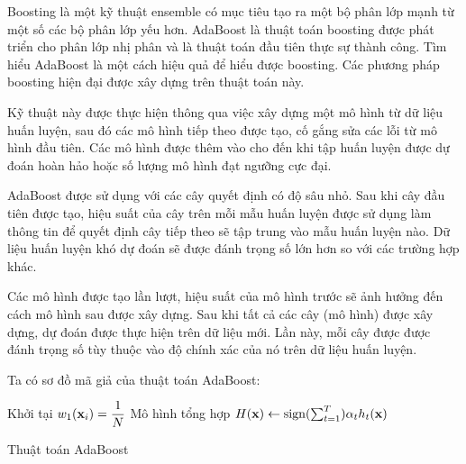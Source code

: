 Boosting là một kỹ thuật ensemble có mục tiêu tạo ra một bộ phân lớp mạnh từ một số các bộ phân lớp yếu hơn. 
AdaBoost là thuật toán boosting được phát triển cho phân lớp nhị phân và là thuật toán đầu tiên thực sự thành công. 
Tìm hiểu AdaBoost là một cách hiệu quả để hiểu được boosting. Các phương pháp boosting hiện đại được xây dựng trên thuật toán này.

Kỹ thuật này được thực hiện thông qua việc xây dựng một mô hình từ dữ liệu huấn luyện, sau đó các mô hình tiếp theo được tạo, cố gắng sửa các lỗi từ mô hình đầu tiên. 
Các mô hình được thêm vào cho đến khi tập huấn luyện được dự đoán hoàn hảo hoặc số lượng mô hình đạt ngưỡng cực đại.

AdaBoost được sử dụng với các cây quyết định có độ sâu nhỏ. 
Sau khi cây đầu tiên được tạo, hiệu suất của cây trên mỗi mẫu huấn luyện được sử dụng làm thông tin để quyết định cây tiếp theo sẽ tập trung vào mẫu huấn luyện nào. 
Dữ liệu huấn luyện khó dự đoán sẽ được đánh trọng số lớn hơn so với các trường hợp khác.

Các mô hình được tạo lần lượt, hiệu suất của mô hình trước sẽ ảnh hưởng đến cách mô hình sau được xây dựng. 
Sau khi tất cả các cây (mô hình) được xây dựng, dự đoán được thực hiện trên dữ liệu mới. 
Lần này, mỗi cây được được đánh trọng số tùy thuộc vào độ chính xác của nó trên dữ liệu huấn luyện.

Ta có sơ đồ mã giả của thuật toán AdaBoost:

\begin{algorithm}[h!]
    \DontPrintSemicolon
    Khởi tại $w_1(\bold{x}_i) = \dfrac{1}{N}$\;
    Mô hình tổng hợp $H(\bold{x}) \gets \mathrm{sign}(\sum_{t=1}^T) \alpha_t h_t(\bold{x})$\;
    \caption{Thuật toán AdaBoost}
\end{algorithm}